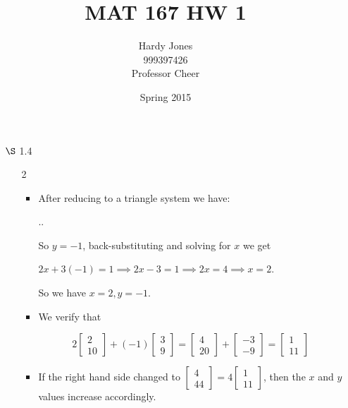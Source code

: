 \documentclass[12pt,letterpaper]{article}
\title{MAT 167 HW 1\vspace{-2ex}}
\author{Hardy Jones\\
        999397426\\
        Professor Cheer\vspace{-2ex}}
\date{Spring 2015}
\begin{document}
  \maketitle

  \begin{enumerate}
    \item [$\S$ 1.4]
      \begin{enumerate}
        \item [2]

          \begin{itemize}
            \item
              After reducing to a triangle system we have:

              \sysdelim..

              So $y = -1$, back-substituting and solving for $x$ we get

              $2x + 3(-1) = 1 \implies 2x - 3 = 1 \implies 2x = 4 \implies x = 2$.

              So we have $x = 2, y = -1$.
            \item
              We verify that

              \[
                2 \begin{bmatrix}2 \\ 10\end{bmatrix} + (-1) \begin{bmatrix}3 \\ 9\end{bmatrix}
                = \begin{bmatrix}4 \\ 20\end{bmatrix} + \begin{bmatrix}-3 \\ -9\end{bmatrix}
                = \begin{bmatrix}1 \\ 11\end{bmatrix}
              \]
            \item
              If the right hand side changed to $\begin{bmatrix}4 \\ 44\end{bmatrix} = 4\begin{bmatrix}1 \\ 11\end{bmatrix}$,
              then the $x$ and $y$ values increase accordingly.


\end{itemize}
\end{enumerate}
\end{enumerate}
\end{document}
